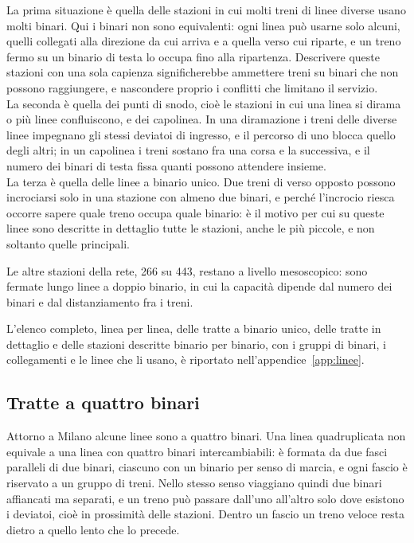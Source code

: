 La prima situazione è quella delle stazioni in cui molti treni di linee diverse usano molti binari. Qui i binari non sono equivalenti: ogni linea può usarne solo alcuni, quelli collegati alla direzione da cui arriva e a quella verso cui riparte, e un treno fermo su un binario di testa lo occupa fino alla ripartenza. Descrivere queste stazioni con una sola capienza significherebbe ammettere treni su binari che non possono raggiungere, e nascondere proprio i conflitti che limitano il servizio. \\
La seconda è quella dei punti di snodo, cioè le stazioni in cui una linea si dirama o più linee confluiscono, e dei capolinea. In una diramazione i treni delle diverse linee impegnano gli stessi deviatoi di ingresso, e il percorso di uno blocca quello degli altri; in un capolinea i treni sostano fra una corsa e la successiva, e il numero dei binari di testa fissa quanti possono attendere insieme. \\
La terza è quella delle linee a binario unico. Due treni di verso opposto possono incrociarsi solo in una stazione con almeno due binari, e perché l'incrocio riesca occorre sapere quale treno occupa quale binario: è il motivo per cui su queste linee sono descritte in dettaglio tutte le stazioni, anche le più piccole, e non soltanto quelle principali.

Le altre stazioni della rete, 266 su 443, restano a livello mesoscopico: sono fermate lungo linee a doppio binario, in cui la capacità dipende dal numero dei binari e dal distanziamento fra i treni.

L'elenco completo, linea per linea, delle tratte a binario unico, delle tratte in dettaglio e delle stazioni descritte binario per binario, con i gruppi di binari, i collegamenti e le linee che li usano, è riportato nell'appendice~\ref{app:linee}.

\subsection{Tratte a quattro binari}
Attorno a Milano alcune linee sono a quattro binari. Una linea quadruplicata non equivale a una linea con quattro binari intercambiabili: è formata da due fasci paralleli di due binari, ciascuno con un binario per senso di marcia, e ogni fascio è riservato a un gruppo di treni. Nello stesso senso viaggiano quindi due binari affiancati ma separati, e un treno può passare dall'uno all'altro solo dove esistono i deviatoi, cioè in prossimità delle stazioni. Dentro un fascio un treno veloce resta dietro a quello lento che lo precede.

